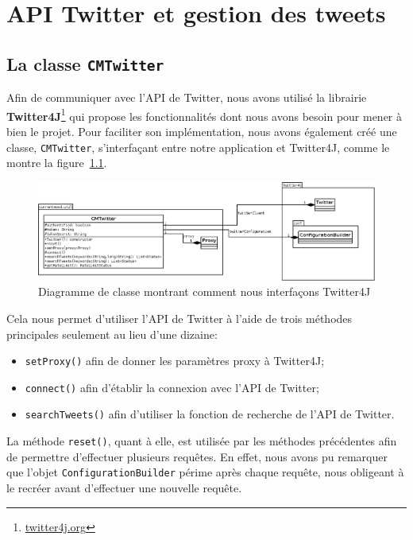 \documentclass[12pt,a4paper]{report}
\begin{document}

\chapter{API Twitter et gestion des tweets}

\section{La classe \texttt{CMTwitter}}

Afin de communiquer avec l'API de Twitter, nous avons utilisé la librairie
\textbf{Twitter4J}\footnote{\href{http://twitter4j.org}{twitter4j.org}} qui
propose les fonctionnalités dont nous avons besoin pour mener à bien le projet.
Pour faciliter son implémentation, nous avons également créé une classe,
\texttt{CMTwitter}, s'interfaçant entre notre application et Twitter4J, comme le
montre la figure~\ref{uml_cmtwitter}.

\begin{figure}[h]
	\includegraphics[width=1\textwidth]{img/uml_cmtwitter.png}
	\caption{Diagramme de classe montrant comment nous interfaçons Twitter4J}
	\label{uml_cmtwitter}
\end{figure}

Cela nous permet d'utiliser l'API de Twitter à l'aide de trois méthodes
principales seulement au lieu d'une dizaine:

\begin{itemize}
	\item
		\texttt{setProxy()} afin de donner les paramètres proxy à Twitter4J;
	\item
		\texttt{connect()} afin d'établir la connexion avec l'API de Twitter;
	\item
		\texttt{searchTweets()} afin d'utiliser la fonction de recherche de
		l'API de Twitter.
\end{itemize}

La méthode \texttt{reset()}, quant à elle, est utilisée par les méthodes
précédentes afin de permettre d'effectuer plusieurs requêtes. En effet, nous
avons pu remarquer que l'objet \texttt{ConfigurationBuilder} périme après chaque
requête, nous obligeant à le recréer avant d'effectuer une nouvelle requête.
\end{document}
